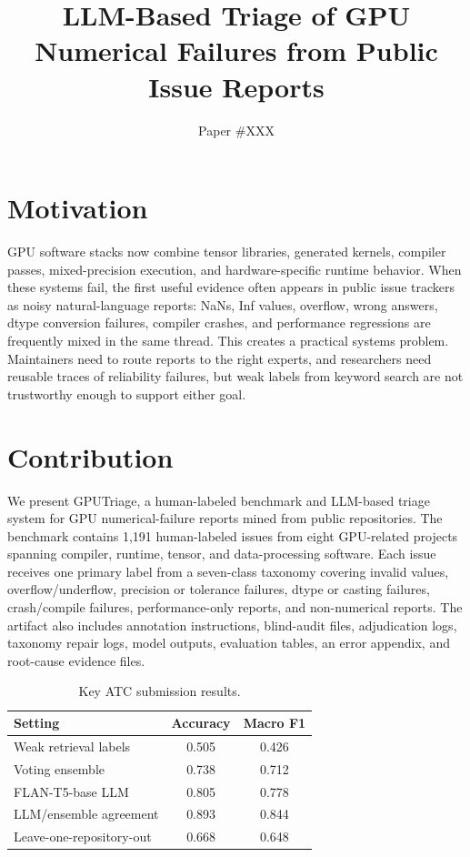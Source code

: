 \documentclass[sigplan,10pt]{acmart}
\newcommand{\system}{GPUTriage}
\begin{document}
\sloppy

\title{LLM-Based Triage of GPU Numerical Failures from Public Issue Reports}

\author{Paper \#XXX}

\maketitle

\section{Motivation}

GPU software stacks now combine tensor libraries, generated kernels, compiler
passes, mixed-precision execution, and hardware-specific runtime behavior.
When these systems fail, the first useful evidence often appears in public
issue trackers as noisy natural-language reports: NaNs, Inf values, overflow,
wrong answers, dtype conversion failures, compiler crashes, and performance
regressions are frequently mixed in the same thread. This creates a practical
systems problem. Maintainers need to route reports to the right experts, and
researchers need reusable traces of reliability failures, but weak labels from
keyword search are not trustworthy enough to support either goal.

\section{Contribution}

We present \system{}, a human-labeled benchmark and LLM-based triage system for
GPU numerical-failure reports mined from public repositories. The benchmark
contains 1,191 human-labeled issues from eight GPU-related projects spanning
compiler, runtime, tensor, and data-processing software. Each issue receives one
primary label from a seven-class taxonomy covering invalid values,
overflow/underflow, precision or tolerance failures, dtype or casting failures,
crash/compile failures, performance-only reports, and non-numerical reports.
The artifact also includes annotation instructions, blind-audit files,
adjudication logs, taxonomy repair logs, model outputs, evaluation tables, an
error appendix, and root-cause evidence files.

\begin{table}[t]
\centering
\caption{Key ATC submission results.}
\label{tab:ea_results}
\begin{tabular}{lcc}
\toprule
Setting & Accuracy & Macro F1 \\
\midrule
Weak retrieval labels & 0.505 & 0.426 \\
Voting ensemble & 0.738 & 0.712 \\
FLAN-T5-base LLM & 0.805 & 0.778 \\
LLM/ensemble agreement & 0.893 & 0.844 \\
Leave-one-repository-out & 0.668 & 0.648 \\
\bottomrule
\end{tabular}
\end{table}
\end{document}
